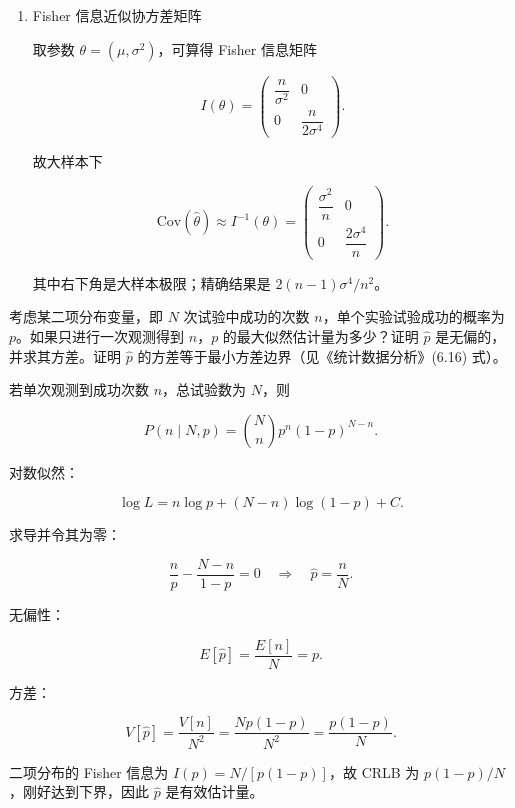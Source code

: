 \begin{question}
\begin{solution}
\begin{enumerate}
\[
\hat\sigma^2=\frac{n-1}{n}s^2,
\]

而第五章已知 \(E[s^2]=\sigma^2\)，高斯情形下

\[
V[s^2]=\frac{2\sigma^4}{n-1},
\]

所以

\[
E[\hat\sigma^2]=\frac{n-1}{n}\sigma^2,
\qquad
V[\hat\sigma^2]=\left(\frac{n-1}{n}\right)^2\frac{2\sigma^4}{n-1}
=\frac{2(n-1)}{n^2}\sigma^4.
\]

\item Fisher 信息近似协方差矩阵

取参数 \(\theta=(\mu,\sigma^2)\)，可算得 Fisher 信息矩阵

\[
I(\theta)=
\begin{pmatrix}
\dfrac{n}{\sigma^2} & 0\\[4pt]
0 & \dfrac{n}{2\sigma^4}
\end{pmatrix}.
\]

故大样本下

\[
\mathrm{Cov}(\hat\theta)\approx I^{-1}(\theta)=
\begin{pmatrix}
\dfrac{\sigma^2}{n} & 0\\[4pt]
0 & \dfrac{2\sigma^4}{n}
\end{pmatrix}.
\]

其中右下角是大样本极限；精确结果是 \(2(n-1)\sigma^4/n^2\)。
\end{enumerate}
\end{solution}
\end{question}



\begin{question}
考虑某二项分布变量，即 \(N\) 次试验中成功的次数
\(n\)，单个实验试验成功的概率为 \(p\)。如果只进行一次观测得到
\(n\)，\(p\) 的最大似然估计量为多少？证明 \(\hat p\)
是无偏的，并求其方差。证明 \(\hat p\)
的方差等于最小方差边界（见《统计数据分析》(6.16) 式）。
\begin{solution}
若单次观测到成功次数 \(n\)，总试验数为 \(N\)，则

\[
P(n\mid N,p)=\binom Nn p^n(1-p)^{N-n}.
\]

对数似然：

\[
\log L=n\log p+(N-n)\log(1-p)+C.
\]

求导并令其为零：

\[
\frac{n}{p}-\frac{N-n}{1-p}=0
\quad\Rightarrow\quad
\hat p=\frac nN.
\]

无偏性：

\[
E[\hat p]=\frac{E[n]}{N}=p.
\]

方差：

\[
V[\hat p]=\frac{V[n]}{N^2}=\frac{Np(1-p)}{N^2}=\frac{p(1-p)}{N}.
\]

二项分布的 Fisher 信息为 \(I(p)=N/[p(1-p)]\)，故 CRLB 为
\(p(1-p)/N\)，刚好达到下界，因此 \(\hat p\) 是有效估计量。
\end{solution}
\end{question}



